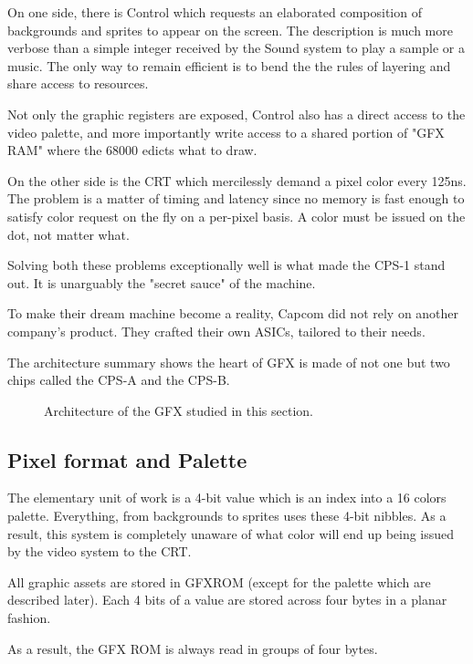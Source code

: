 On one side, there is Control which requests an elaborated composition of backgrounds and sprites to appear on the screen. The description is much more verbose than a simple integer received by the Sound system to play a sample or a music. The only way to remain efficient is to bend the the rules of layering and share access to resources. 

Not only the graphic registers are exposed, Control also has a direct access to the video palette, and more importantly write access to a shared portion of "GFX RAM" where the 68000 edicts what to draw.

On the other side is the CRT which mercilessly demand a pixel color every 125ns. The problem is a matter of timing and latency since no memory is fast enough to satisfy color request on the fly on a per-pixel basis. A color must be issued on the dot, not matter what.

Solving both these problems exceptionally well is what made the CPS-1 stand out. It is unarguably the "secret sauce" of the machine. 

To make their dream machine become a reality, Capcom did not rely on another company's product. They crafted their own ASICs, tailored to their needs.

The architecture summary shows the heart of GFX is made of not one but two chips called the CPS-A and the CPS-B. 

\begin{figure}[H]
\caption*{Architecture of the GFX studied in this section.}
\end{figure}




\subsection{Pixel format and Palette}
The elementary unit of work is a 4-bit value which is an index into a 16 colors palette. Everything, from backgrounds to sprites uses these 4-bit nibbles. As a result, this system is completely unaware of what color will end up being issued by the video system to the CRT.

All graphic assets are stored in GFXROM (except for the palette which are described later). Each 4 bits of a value are stored across four bytes in a planar fashion.






As a result, the GFX ROM is always read in groups of four bytes.

